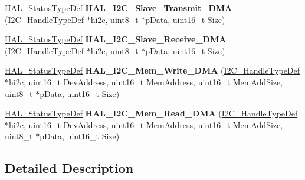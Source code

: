 \begin{DoxyCompactItemize}
\hyperlink{stm32f0xx__hal__def_8h_a63c0679d1cb8b8c684fbb0632743478f}{H\+A\+L\+\_\+\+Status\+Type\+Def} {\bfseries H\+A\+L\+\_\+\+I2\+C\+\_\+\+Slave\+\_\+\+Transmit\+\_\+\+D\+MA} (\hyperlink{struct_____i2_c___handle_type_def}{I2\+C\+\_\+\+Handle\+Type\+Def} $\ast$hi2c, uint8\+\_\+t $\ast$p\+Data, uint16\+\_\+t Size)
\item 
\mbox{\label{group___i2_c___exported___functions___group2_gad9dd42a10e5c108e30e6546cb64639c2}} 
\hyperlink{stm32f0xx__hal__def_8h_a63c0679d1cb8b8c684fbb0632743478f}{H\+A\+L\+\_\+\+Status\+Type\+Def} {\bfseries H\+A\+L\+\_\+\+I2\+C\+\_\+\+Slave\+\_\+\+Receive\+\_\+\+D\+MA} (\hyperlink{struct_____i2_c___handle_type_def}{I2\+C\+\_\+\+Handle\+Type\+Def} $\ast$hi2c, uint8\+\_\+t $\ast$p\+Data, uint16\+\_\+t Size)
\item 
\mbox{\label{group___i2_c___exported___functions___group2_ga12a2a86be393359534f630cdd090d8bb}} 
\hyperlink{stm32f0xx__hal__def_8h_a63c0679d1cb8b8c684fbb0632743478f}{H\+A\+L\+\_\+\+Status\+Type\+Def} {\bfseries H\+A\+L\+\_\+\+I2\+C\+\_\+\+Mem\+\_\+\+Write\+\_\+\+D\+MA} (\hyperlink{struct_____i2_c___handle_type_def}{I2\+C\+\_\+\+Handle\+Type\+Def} $\ast$hi2c, uint16\+\_\+t Dev\+Address, uint16\+\_\+t Mem\+Address, uint16\+\_\+t Mem\+Add\+Size, uint8\+\_\+t $\ast$p\+Data, uint16\+\_\+t Size)
\item 
\mbox{\label{group___i2_c___exported___functions___group2_gab25b99552182d2486d8eb441fffdd0a4}} 
\hyperlink{stm32f0xx__hal__def_8h_a63c0679d1cb8b8c684fbb0632743478f}{H\+A\+L\+\_\+\+Status\+Type\+Def} {\bfseries H\+A\+L\+\_\+\+I2\+C\+\_\+\+Mem\+\_\+\+Read\+\_\+\+D\+MA} (\hyperlink{struct_____i2_c___handle_type_def}{I2\+C\+\_\+\+Handle\+Type\+Def} $\ast$hi2c, uint16\+\_\+t Dev\+Address, uint16\+\_\+t Mem\+Address, uint16\+\_\+t Mem\+Add\+Size, uint8\+\_\+t $\ast$p\+Data, uint16\+\_\+t Size)
\end{DoxyCompactItemize}


\subsection{Detailed Description}

